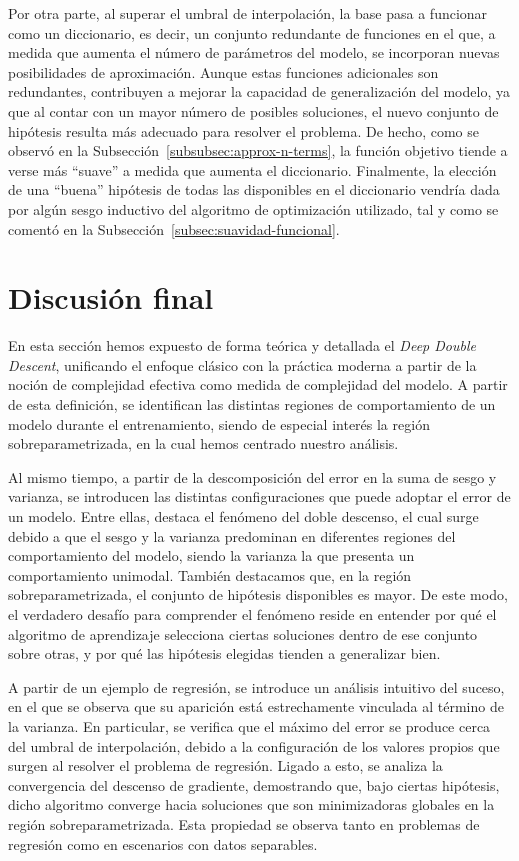 Por otra parte, al superar el umbral de interpolación, la base pasa a funcionar como un diccionario, es decir, un conjunto redundante de funciones en el que, a medida que aumenta el número de parámetros del modelo, se incorporan nuevas posibilidades de aproximación. Aunque estas funciones adicionales son redundantes, contribuyen a mejorar la capacidad de generalización del modelo, ya que al contar con un mayor número de posibles soluciones, el nuevo conjunto de hipótesis resulta más adecuado para resolver el problema. De hecho, como se observó en la Subsección~\ref{subsubsec:approx-n-terms}, la función objetivo tiende a verse más “suave” a medida que aumenta el diccionario. Finalmente, la elección de una ``buena'' hipótesis de todas las disponibles en el diccionario vendría dada por algún sesgo inductivo del algoritmo de optimización utilizado, tal y como se comentó en la Subsección~\ref{subsec:suavidad-funcional}.

\section{Discusión final}\label{sec:conclusion-matematica}

En esta sección hemos expuesto de forma teórica y detallada el \textit{Deep Double Descent}, unificando el enfoque clásico con la práctica moderna a partir de la noción de complejidad efectiva como medida de complejidad del modelo. A partir de esta definición, se identifican las distintas regiones de comportamiento de un modelo durante el entrenamiento, siendo de especial interés la región sobreparametrizada, en la cual hemos centrado nuestro análisis.

Al mismo tiempo, a partir de la descomposición del error en la suma de sesgo y varianza, se introducen las distintas configuraciones que puede adoptar el error de un modelo. Entre ellas, destaca el fenómeno del doble descenso, el cual surge debido a que el sesgo y la varianza predominan en diferentes regiones del comportamiento del modelo, siendo la varianza la que presenta un comportamiento unimodal. También destacamos que, en la región sobreparametrizada, el conjunto de hipótesis disponibles es mayor. De este modo, el verdadero desafío para comprender el fenómeno reside en entender por qué el algoritmo de aprendizaje selecciona ciertas soluciones dentro de ese conjunto sobre otras, y por qué las hipótesis elegidas tienden a generalizar bien.

A partir de un ejemplo de regresión, se introduce un análisis intuitivo del suceso, en el que se observa que su aparición está estrechamente vinculada al término de la varianza. En particular, se verifica que el máximo del error se produce cerca del umbral de interpolación, debido a la configuración de los valores propios que surgen al resolver el problema de regresión. Ligado a esto, se analiza la convergencia del descenso de gradiente, demostrando que, bajo ciertas hipótesis, dicho algoritmo converge hacia soluciones que son minimizadoras globales en la región sobreparametrizada. Esta propiedad se observa tanto en problemas de regresión como en escenarios con datos separables.

